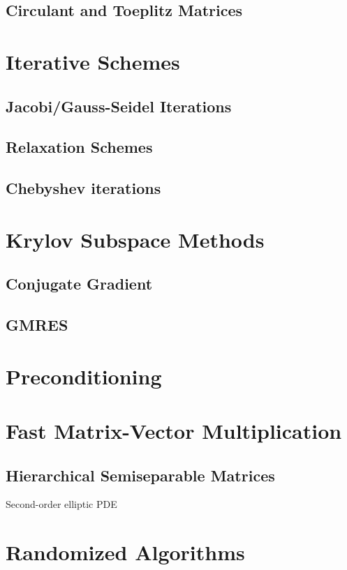 \subsection{Circulant and Toeplitz Matrices}

\section{Iterative Schemes}
\subsection{Jacobi/Gauss-Seidel Iterations}
\subsection{Relaxation Schemes}
\subsection{Chebyshev iterations}
\newpage
\section{Krylov Subspace Methods}
\subsection{Conjugate Gradient}
\subsection{GMRES}

\section{Preconditioning}

\section{Fast Matrix-Vector Multiplication}
\subsection{Hierarchical Semiseparable Matrices}
\begin{example}
    Second-order elliptic PDE
\end{example}
\section{Randomized Algorithms}


% 
\nocite{}


